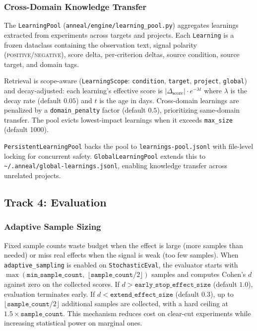 \subsubsection{Cross-Domain Knowledge Transfer}\label{sec:learning-pool}

The \texttt{LearningPool} (\texttt{anneal/engine/learning\_pool.py}) aggregates learnings extracted from experiments across targets and projects.
Each \texttt{Learning} is a frozen dataclass containing the observation text, signal polarity (\textsc{positive}/\textsc{negative}), score delta, per-criterion deltas, source condition, source target, and domain tags.

Retrieval is scope-aware (\texttt{LearningScope}: \texttt{condition}, \texttt{target}, \texttt{project}, \texttt{global}) and decay-adjusted: each learning's effective score is $|\Delta_{\text{score}}| \cdot e^{-\lambda t}$ where $\lambda$ is the decay rate (default $0.05$) and $t$ is the age in days.
Cross-domain learnings are penalized by a \texttt{domain\_penalty} factor (default $0.5$), prioritizing same-domain transfer.
The pool evicts lowest-impact learnings when it exceeds \texttt{max\_size} (default 1000).

\texttt{PersistentLearningPool} backs the pool to \texttt{learnings-pool.jsonl} with file-level locking for concurrent safety.
\texttt{GlobalLearningPool} extends this to \texttt{\~{}/.anneal/global-learnings.jsonl}, enabling knowledge transfer across unrelated projects.

\subsection{Track 4: Evaluation}\label{sec:track-evaluation}

\subsubsection{Adaptive Sample Sizing}\label{sec:adaptive-sampling}

Fixed sample counts waste budget when the effect is large (more samples than needed) or miss real effects when the signal is weak (too few samples).
When \texttt{adaptive\_sampling} is enabled on \texttt{StochasticEval}, the evaluator starts with $\max(\texttt{min\_sample\_count},\; \lfloor\texttt{sample\_count} / 2\rfloor)$ samples and computes Cohen's $d$ against zero on the collected scores.
If $d > \texttt{early\_stop\_effect\_size}$ (default $1.0$), evaluation terminates early.
If $d < \texttt{extend\_effect\_size}$ (default $0.3$), up to $\lfloor\texttt{sample\_count} / 2\rfloor$ additional samples are collected, with a hard ceiling at $1.5 \times \texttt{sample\_count}$.
This mechanism reduces cost on clear-cut experiments while increasing statistical power on marginal ones.

